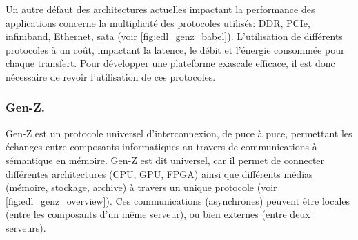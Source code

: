         Un autre défaut des architectures actuelles impactant la performance des applications concerne la multiplicité des protocoles utilisés: DDR, PCIe, infiniband, Ethernet, sata (voir \autoref{fig:edl_genz_babel}). L'utilisation de différents protocoles à un coût, impactant la latence, le débit et l'énergie consommée pour chaque transfert. Pour développer une plateforme exascale efficace, il est donc nécessaire de revoir l'utilisation de ces protocoles.
            
           
        
   
    
    \subsubsection{Gen-Z.}
        
        Gen-Z est un protocole universel d'interconnexion, de puce à puce, permettant les échanges entre composants informatiques au travers de communications à sémantique en mémoire. Gen-Z est dit universel, car il permet de connecter différentes architectures (CPU, GPU, FPGA) ainsi que différents médias (mémoire, stockage, archive) à travers un unique protocole (voir \autoref{fig:edl_genz_overview}). Ces communications (asynchrones) peuvent être locales (entre les composants d'un même serveur), ou bien externes (entre deux serveurs). 



